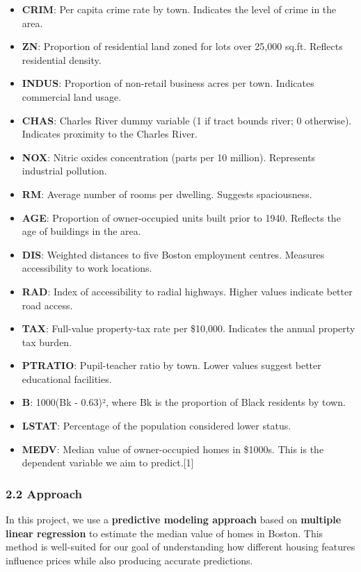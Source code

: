 \documentclass[
]{article}
\providecommand{\tightlist}{%
  \setlength{\itemsep}{0pt}\setlength{\parskip}{0pt}}
\begin{document}
\begin{itemize}
\tightlist
\item
  \textbf{CRIM}: Per capita crime rate by town. Indicates the level of
  crime in the area.
\item
  \textbf{ZN}: Proportion of residential land zoned for lots over 25,000
  sq.ft. Reflects residential density.
\item
  \textbf{INDUS}: Proportion of non-retail business acres per town.
  Indicates commercial land usage.
\item
  \textbf{CHAS}: Charles River dummy variable (1 if tract bounds river;
  0 otherwise). Indicates proximity to the Charles River.
\item
  \textbf{NOX}: Nitric oxides concentration (parts per 10 million).
  Represents industrial pollution.
\item
  \textbf{RM}: Average number of rooms per dwelling. Suggests
  spaciousness.
\item
  \textbf{AGE}: Proportion of owner-occupied units built prior to 1940.
  Reflects the age of buildings in the area.
\item
  \textbf{DIS}: Weighted distances to five Boston employment centres.
  Measures accessibility to work locations.
\item
  \textbf{RAD}: Index of accessibility to radial highways. Higher values
  indicate better road access.
\item
  \textbf{TAX}: Full-value property-tax rate per \$10,000. Indicates the
  annual property tax burden.
\item
  \textbf{PTRATIO}: Pupil-teacher ratio by town. Lower values suggest
  better educational facilities.
\item
  \textbf{B}: 1000(Bk - 0.63)², where Bk is the proportion of Black
  residents by town.
\item
  \textbf{LSTAT}: Percentage of the population considered lower status.
\item
  \textbf{MEDV}: Median value of owner-occupied homes in \$1000s. This
  is the dependent variable we aim to predict.{[}1{]}
\end{itemize}

\subsubsection{2.2 Approach}\label{approach}

In this project, we use a \textbf{predictive modeling approach} based on
\textbf{multiple linear regression} to estimate the median value of
homes in Boston. This method is well-suited for our goal of
understanding how different housing features influence prices while also
producing accurate predictions.
\end{document}

